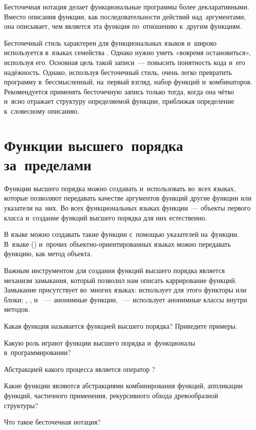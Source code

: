 Бесточечная нотация делает функциональные программы более декларативными. Вместо описания функции, как последовательности действий над~аргументами, она описывает, чем является эта функция по~отношению к~другим функциям.

Бесточечный стиль характерен для функциональных языков и~широко используется в~языках семейства . Однако нужно уметь «вовремя остановиться», используя его. Основная цель такой записи~--- повысить понятность кода и~его надёжность. Однако, используя бесточечный стиль, очень легко превратить программу в~бессмысленный, на~первый взгляд, набор функций и~комбинаторов. Рекомендуется применять бесточечную запись только тогда, когда она чётко и~ясно отражает структуру определяемой функции, приближая определение к~словесному описанию.

\section[4]{Функции высшего~порядка \mbox{за~пределами~\Scheme}}%
Функции высшего порядка можно создавать и~использовать во~всех языках, которые позволяют передавать качестве аргументов функций другие функции или указатели на~них.
Во всех функциональных языках функции~--- объекты первого класса и~создание функций высшего порядка для них естественно.

В языке  можно создавать такие функции с~помощью указателей на~функции. В~языке  () и~прочих объектно-ориентированных языках можно передавать функцию, как метод объекта.

Важным инструментом для создания функций высшего порядка является механизм замыкания, который позволил нам описать каррирование функций. Замыкание присутствует во~многих языках:  использует для этого функторы или блоки; , ,  и~~--- анонимные функции, ~--- использует анонимные классы внутри методов.

\begin{Queeze}

\item Какая функция называется функцией высшего порядка? Приведите примеры.

 \item Какую роль играют функции высшего порядка и~функционалы в~программировании?

 \item Абстракцией какого процесса является оператор ?

 \item Какие функции являются абстракциями комбинирования функций, аппликации функций, частичного применения, рекурсивного обхода древообразной структуры?

 \item Что такое бесточечная нотация?

\end{Queeze}
